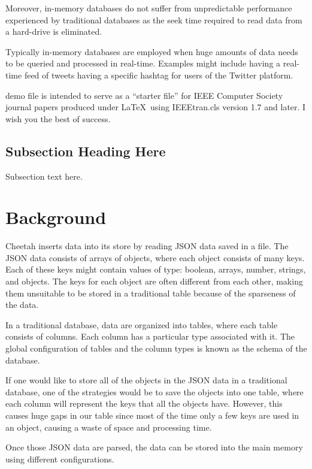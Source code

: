 \documentclass[11pt,journal,compsoc]{IEEEtran}
\begin{document}
Moreover, in-memory databases do not suffer from unpredictable performance
experienced by traditional databases as the seek time required to read data from
a hard-drive is eliminated.


Typically in-memory databases are employed when huge amounts of data needs to be
queried and processed in real-time. Examples might include having a real-time
feed of tweets having a specific hashtag for users of the Twitter platform.


 demo file is intended to serve as a ``starter file''
for IEEE Computer Society journal papers produced under \LaTeX\ using
IEEEtran.cls version 1.7 and later.
I wish you the best of success.

\subsection{Subsection Heading Here}
Subsection text here.

\section{Background}
Cheetah inserts data into its store by reading JSON data saved in a file. The
JSON data consists of arrays of objects, where each object consists of many
keys. Each of these keys might contain values of type: boolean, arrays, number,
strings, and objects. The keys for each object are often different from each
other, making them unsuitable to be stored in a traditional table because of the
sparseness of the data.


In a traditional database, data are organized into tables, where each table
consists of columns. Each column has a particular type associated with it. The
global configuration of tables and the column types is known as the schema of
the database.


If one would like to store all of the objects in the JSON data in a traditional
database, one of the strategies would be to save the objects into one table,
where each column will represent the keys that all the objects have. However,
this causes huge gaps in our table since most of the time only a few keys are
used in an object, causing a waste of space and processing time.


Once those JSON data are parsed, the data can be stored into the main memory
using different configurations.
\end{document}
